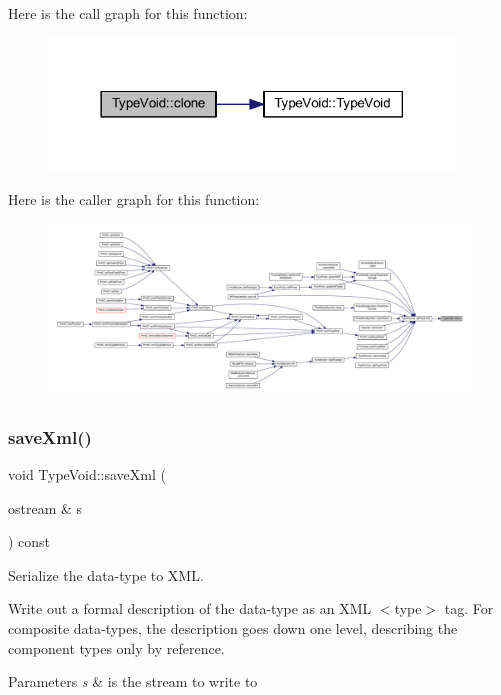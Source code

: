 Here is the call graph for this function\+:
\nopagebreak
\begin{figure}[H]
\begin{center}
\leavevmode
\includegraphics[width=306pt]{class_type_void_a4fe8a82cb4657566119e63b73164d22a_cgraph}
\end{center}
\end{figure}
Here is the caller graph for this function\+:
\nopagebreak
\begin{figure}[H]
\begin{center}
\leavevmode
\includegraphics[width=350pt]{class_type_void_a4fe8a82cb4657566119e63b73164d22a_icgraph}
\end{center}
\end{figure}
\mbox{\label{class_type_void_a4c29213947ce96b7899e5c8102ec54dc}} 
\subsubsection{\texorpdfstring{saveXml()}{saveXml()}}
{\footnotesize\ttfamily void Type\+Void\+::save\+Xml (\begin{DoxyParamCaption}\item[{ostream \&}]{s }\end{DoxyParamCaption}) const\hspace{0.3cm}{\ttfamily [virtual]}}



Serialize the data-\/type to X\+ML. 

Write out a formal description of the data-\/type as an X\+ML $<$type$>$ tag. For composite data-\/types, the description goes down one level, describing the component types only by reference. 
\begin{DoxyParams}{Parameters}
{\em s} & is the stream to write to \\
\hline
\end{DoxyParams}


